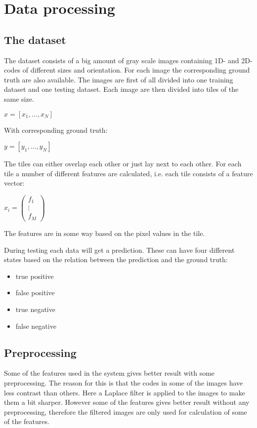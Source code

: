 \chapter{Data processing}
\label{sec:Data processing}

\section{The dataset}
\label{The dataset}
The dataset consists of a big amount of gray scale images containing 1D- and 2D-codes of different sizes and orientation. For each image the corresponding ground truth are also available. The images are first of all divided into one training dataset and one testing dataset. Each image are then divided into tiles of the same size. 
\begin{center}
	$x = [x_1,...,x_N]$
\end{center}
With corresponding ground truth:
\begin{center}
	$y = [y_1,...,y_N]$
\end{center}
The tiles can either overlap each other or just lay next to each other. For each tile a number of different features are calculated, i.e. each tile consists of a feature vector:
\begin{center}
\begin{math}
	x_i =  
	\begin{pmatrix}
		 f_1 \\ \vdots \\ f_M
	\end{pmatrix}
\end{math}
\end{center}  
The features are in some way based on the pixel values in the tile.

During testing each data will get a prediction. These can have four different states based on the relation between the prediction and the ground truth:
\begin{itemize}
	\item true positive
	\item false positive
	\item true negative
	\item false negative
\end{itemize}

\section{Preprocessing}
\label{Preprocessing}
Some of the features used in the system gives better result with some preprocessing. The reason for this is that the codes in some of the images have less contrast than others. Here a Laplace filter is applied to the images to make them a bit sharper. However some of the features gives better result without any preprocessing, therefore the filtered images are only used for calculation of some of the features.


